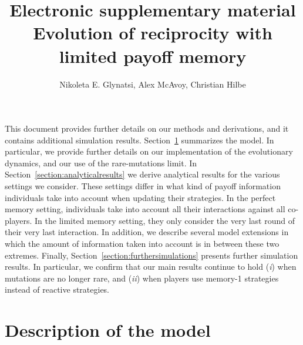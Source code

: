 \documentclass[11pt]{article}
\title{{ \sffamily \LARGE Electronic supplementary material}\\{\bf \sffamily \LARGE Evolution of reciprocity with limited payoff memory}}
\date{}
\author{Nikoleta E. Glynatsi, Alex McAvoy,  Christian Hilbe}
\theoremstyle{plainCl1}
\theoremstyle{plainCl2}
\begin{document}
\maketitle



\noindent
This document provides further details on our methods and derivations, and it contains additional simulation results. 
Section~\ref{section:model} summarizes the model. 
In particular, we provide further details on our implementation of the evolutionary dynamics, and our use of the rare-mutations limit. 
In Section~\ref{section:analyticalresults} we derive analytical results for the various settings we consider.
These settings differ in what kind of payoff information individuals take into account when updating their strategies. 
In the perfect memory setting, individuals take into account all their interactions against all co-players.
In the limited memory setting, they only consider the very last round of their very last interaction.  
In addition, we describe several model extensions in which the amount of information taken into account is in between these two extremes. 
Finally, Section~\ref{section:furthersimulations} presents further simulation results. 
In particular, we confirm that our main results continue to hold ({\it i}) when mutations are no longer rare, and  ({\it ii}) when players use memory-1 strategies instead of reactive strategies.




\section{Description of the model}\label{section:model}

\end{document}

